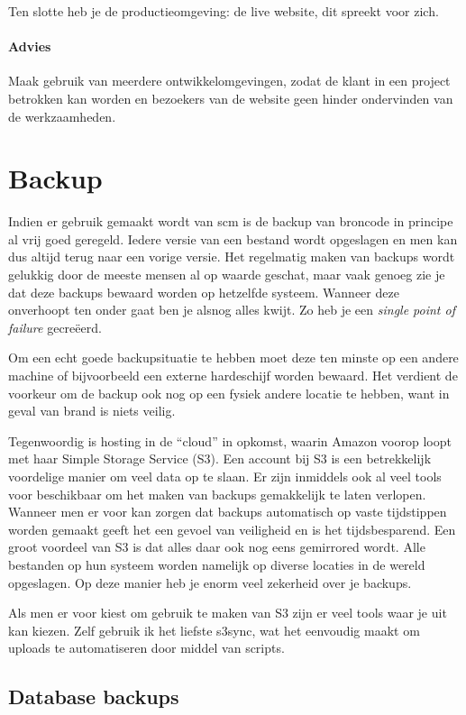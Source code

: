 Ten slotte heb je de productieomgeving: de live website, dit spreekt voor zich.

\paragraph{Advies} Maak gebruik van meerdere ontwikkelomgevingen, zodat de klant in een project betrokken kan worden en bezoekers van de website geen hinder ondervinden van de werkzaamheden.

\section{Backup}

Indien er gebruik gemaakt wordt van {\sc scm} is de backup van broncode in principe al vrij goed geregeld. Iedere versie van een bestand wordt opgeslagen en men kan dus altijd terug naar een vorige versie. Het regelmatig maken van backups wordt gelukkig door de meeste mensen al op waarde geschat, maar vaak genoeg zie je dat deze backups bewaard worden op hetzelfde systeem. Wanneer deze onverhoopt ten onder gaat ben je alsnog alles kwijt. Zo heb je een  \emph{single point of failure} gecreëerd.

Om een echt goede backupsituatie te hebben moet deze ten minste op een andere machine of bijvoorbeeld een externe hardeschijf worden bewaard. Het verdient de voorkeur om de backup ook nog op een fysiek andere locatie te hebben, want in geval van brand is niets veilig.

Tegenwoordig is hosting in de ``cloud'' in opkomst, waarin Amazon voorop loopt met haar Simple Storage Service (S3). Een account bij S3 is een betrekkelijk voordelige manier om veel data op te slaan. Er zijn inmiddels ook al veel tools voor beschikbaar om het maken van backups gemakkelijk te laten verlopen. Wanneer men er voor kan zorgen dat backups automatisch op vaste tijdstippen worden gemaakt geeft het een gevoel van veiligheid en is het tijdsbesparend. Een groot voordeel van S3 is dat alles daar ook nog eens gemirrored wordt. Alle bestanden op hun systeem worden namelijk op diverse locaties in de wereld opgeslagen. Op deze manier heb je enorm veel zekerheid over je backups.

Als men er voor kiest om gebruik te maken van S3 zijn er veel tools waar je uit kan kiezen.\cite{amazontools} Zelf gebruik ik het liefste s3sync\cite{s3sync}, wat het eenvoudig maakt om uploads te automatiseren door middel van scripts.

\subsection{Database backups}

